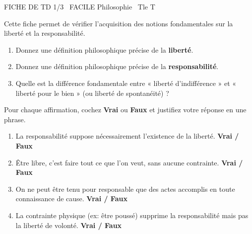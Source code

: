\documentclass[11pt]{article}
\begin{document}
\begin{tcolorbox}[enhanced,colback=popink,colframe=popink,arc=10pt,boxrule=0pt,left=12pt,right=12pt,top=9pt,bottom=9pt]
{\color{white}\popxbold\small FICHE DE TD 1/3 \textbullet\ FACILE \hfill Philosophie \textbullet\ Tle T\par}
\end{tcolorbox}
\vspace{4pt}
Cette fiche permet de vérifier l'acquisition des notions fondamentales sur la liberté et la responsabilité.

\begin{exercice}
\begin{enumerate}
    \item Donnez une définition philosophique précise de la \textbf{liberté}.
    \item Donnez une définition philosophique précise de la \textbf{responsabilité}.
    \item Quelle est la différence fondamentale entre « liberté d'indifférence » et « liberté pour le bien » (ou liberté de spontanéité) ?
\end{enumerate}
\end{exercice}

\begin{exercice}
Pour chaque affirmation, cochez \textbf{Vrai} ou \textbf{Faux} et justifiez votre réponse en une phrase.
\begin{enumerate}
    \item La responsabilité suppose nécessairement l'existence de la liberté. \hfill \textbf{Vrai / Faux}
    \item Être libre, c'est faire tout ce que l'on veut, sans aucune contrainte. \hfill \textbf{Vrai / Faux}
    \item On ne peut être tenu pour responsable que des actes accomplis en toute connaissance de cause. \hfill \textbf{Vrai / Faux}
    \item La contrainte physique (ex: être poussé) supprime la responsabilité mais pas la liberté de volonté. \hfill \textbf{Vrai / Faux}
\end{enumerate}
\end{exercice}
\end{document}
